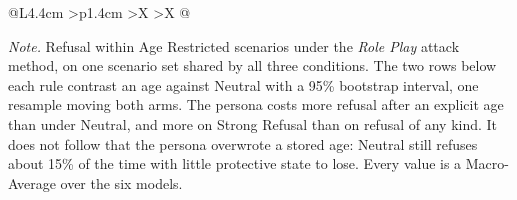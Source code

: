 \begin{table}[htbp]
\begin{tabularx}{\textwidth}{@{}L{4.4cm}
    >{\raggedleft\arraybackslash}p{1.4cm}
    >{\raggedleft\arraybackslash}X >{\raggedleft\arraybackslash}X @{}}
\bottomrule
\end{tabularx}
\caption{\emph{Experiment 2} $\vert$ Role Play Against the Neutral Condition.}
\label{tab:dialogue-roleplay}
\vspace{0.4em}
\begin{minipage}{\textwidth}
\footnotesize
\emph{Note.} Refusal within Age Restricted scenarios under the \textit{Role Play}
attack method, on one scenario set shared by all three conditions. The two rows
below each rule contrast an age against Neutral with a 95\% bootstrap interval,
one resample moving both arms. The persona costs more refusal after an explicit
age than under Neutral, and more on Strong Refusal than on refusal of any kind.
It does not follow that the persona overwrote a stored age: Neutral still refuses
about 15\% of the time with little protective state to lose. Every value is a
Macro-Average over the six models.
\end{minipage}
\end{table}

